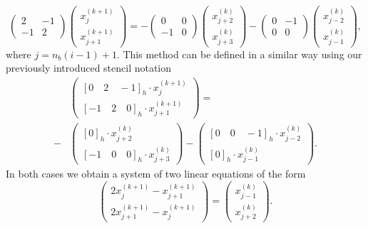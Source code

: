 \begin{equation}
	\begin{pmatrix}
		2 & -1 \\
		-1 & 2
	\end{pmatrix}
	\begin{pmatrix}
		x_{j}^{(k+1)} \\ x_{j+1}^{(k+1)} 
	\end{pmatrix}
= 	-  \begin{pmatrix}
	0 & 0 \\
	-1 & 0
\end{pmatrix} 	
\begin{pmatrix}
x_{j+2}^{(k)} \\ x_{j+3}^{(k)}
\end{pmatrix} -
\begin{pmatrix}
	0 & -1 \\
	0 & 0
\end{pmatrix} 	
\begin{pmatrix}
	x_{j-2}^{(k)} \\ x_{j-1}^{(k)} 
\end{pmatrix},
\end{equation}
where $j = n_b (i - 1) + 1$.
This method can be defined in a similar way using our previously introduced stencil notation
\begin{equation}
\begin{split}
	& \begin{pmatrix}
		\left[0 \quad 2 \quad -1 \right]_{h} \cdot x_{j}^{(k+1)} \\ \left[ -1 \quad 2 \quad 0 \right]_{h} \cdot x_{j+1}^{(k+1)} 
	\end{pmatrix}
	= \\ - & 
	\begin{pmatrix}
		\left[ 0 \right]_{h} \cdot x_{j+2}^{(k)} \\ \left[-1 \quad 0 \quad 0 \right]_{h} \cdot x_{j + 3}^{(k)}
	\end{pmatrix} -
	\begin{pmatrix}
		\left[0 \quad 0 \quad -1 \right]_{h} \cdot x_{j-2}^{(k)} \\ \left[ 0 \right]_{h} \cdot x_{j-1}^{(k)} 
	\end{pmatrix}.
\end{split}
\end{equation}
In both cases we obtain a system of two linear equations of the form
\begin{equation}
	\begin{pmatrix}
		2 x_{j}^{(k+1)} - x_{j+1}^{(k+1)} \\ 2 x_{j+1}^{(k+1)} - x_{j}^{(k+1)} 
	\end{pmatrix}
	=
	\begin{pmatrix}
		x_{j - 1}^{(k)} \\ x_{j + 2}^{(k)}
	\end{pmatrix}.
\end{equation}
